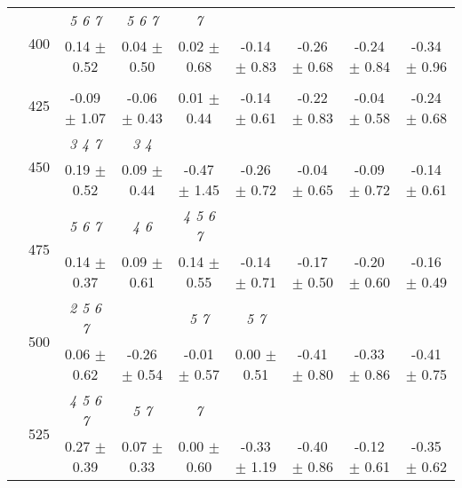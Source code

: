 \begin{table}[h]
{\begin{tabular}{
        ccccccccc}
 & \multirow{2}{*}{400}& \textit{ 5 6 7 }& \textit{ 5 6 7 }& \textit{ 7 }& & & &  \\ 
 & & 0.14 $\pm$ 0.52& 0.04 $\pm$ 0.50& 0.02 $\pm$ 0.68& -0.14 $\pm$ 0.83& -0.26 $\pm$ 0.68& -0.24 $\pm$ 0.84& -0.34 $\pm$ 0.96 \\ 
 & \multirow{2}{*}{425}& \cellcolor[HTML]{EFEFEF} & \cellcolor[HTML]{EFEFEF} & \cellcolor[HTML]{EFEFEF} & \cellcolor[HTML]{EFEFEF} & \cellcolor[HTML]{EFEFEF} & \cellcolor[HTML]{EFEFEF} & \cellcolor[HTML]{EFEFEF}  \\ 
 & & \cellcolor[HTML]{EFEFEF} -0.09 $\pm$ 1.07& \cellcolor[HTML]{EFEFEF} -0.06 $\pm$ 0.43& \cellcolor[HTML]{EFEFEF} 0.01 $\pm$ 0.44& \cellcolor[HTML]{EFEFEF} -0.14 $\pm$ 0.61& \cellcolor[HTML]{EFEFEF} -0.22 $\pm$ 0.83& \cellcolor[HTML]{EFEFEF} -0.04 $\pm$ 0.58& \cellcolor[HTML]{EFEFEF} -0.24 $\pm$ 0.68 \\ 
 & \multirow{2}{*}{450}& \textit{ 3 4 7 }& \textit{ 3 4 }& & & & &  \\ 
 & & 0.19 $\pm$ 0.52& 0.09 $\pm$ 0.44& -0.47 $\pm$ 1.45& -0.26 $\pm$ 0.72& -0.04 $\pm$ 0.65& -0.09 $\pm$ 0.72& -0.14 $\pm$ 0.61 \\ 
 & \multirow{2}{*}{475}& \cellcolor[HTML]{EFEFEF} \textit{ 5 6 7 }& \cellcolor[HTML]{EFEFEF} \textit{ 4 6 }& \cellcolor[HTML]{EFEFEF} \textit{ 4 5 6 7 }& \cellcolor[HTML]{EFEFEF} & \cellcolor[HTML]{EFEFEF} & \cellcolor[HTML]{EFEFEF} & \cellcolor[HTML]{EFEFEF}  \\ 
 & & \cellcolor[HTML]{EFEFEF} 0.14 $\pm$ 0.37& \cellcolor[HTML]{EFEFEF} 0.09 $\pm$ 0.61& \cellcolor[HTML]{EFEFEF} 0.14 $\pm$ 0.55& \cellcolor[HTML]{EFEFEF} -0.14 $\pm$ 0.71& \cellcolor[HTML]{EFEFEF} -0.17 $\pm$ 0.50& \cellcolor[HTML]{EFEFEF} -0.20 $\pm$ 0.60& \cellcolor[HTML]{EFEFEF} -0.16 $\pm$ 0.49 \\ 
 & \multirow{2}{*}{500}& \textit{ 2 5 6 7 }& & \textit{ 5 7 }& \textit{ 5 7 }& & &  \\ 
 & & 0.06 $\pm$ 0.62& -0.26 $\pm$ 0.54& -0.01 $\pm$ 0.57& 0.00 $\pm$ 0.51& -0.41 $\pm$ 0.80& -0.33 $\pm$ 0.86& -0.41 $\pm$ 0.75 \\ 
 & \multirow{2}{*}{525}& \cellcolor[HTML]{EFEFEF} \textit{ 4 5 6 7 }& \cellcolor[HTML]{EFEFEF} \textit{ 5 7 }& \cellcolor[HTML]{EFEFEF} \textit{ 7 }& \cellcolor[HTML]{EFEFEF} & \cellcolor[HTML]{EFEFEF} & \cellcolor[HTML]{EFEFEF} & \cellcolor[HTML]{EFEFEF}  \\ 
 & & \cellcolor[HTML]{EFEFEF} 0.27 $\pm$ 0.39& \cellcolor[HTML]{EFEFEF} 0.07 $\pm$ 0.33& \cellcolor[HTML]{EFEFEF} 0.00 $\pm$ 0.60& \cellcolor[HTML]{EFEFEF} -0.33 $\pm$ 1.19& \cellcolor[HTML]{EFEFEF} -0.40 $\pm$ 0.86& \cellcolor[HTML]{EFEFEF} -0.12 $\pm$ 0.61& \cellcolor[HTML]{EFEFEF} -0.35 $\pm$ 0.62 \\ 

\end{tabular}}
\end{table}
